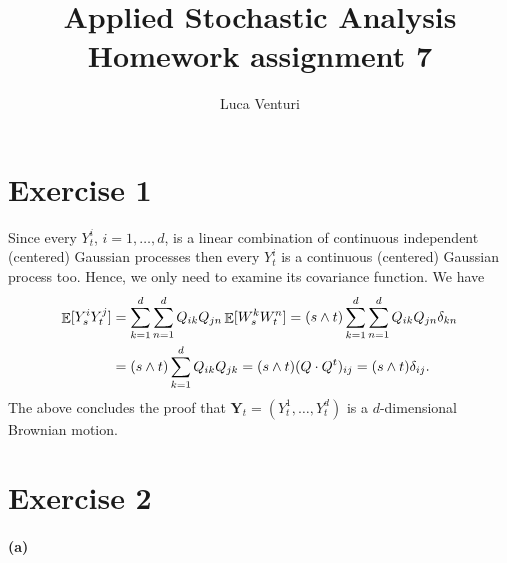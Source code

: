 \documentclass[a4paper,11pt]{article}
\theoremstyle{definition}
\theoremstyle{plain}
\theoremstyle{remark}
\DeclarePairedDelimiter{\parq}{[}{]}
\DeclareMathOperator*{\expval}{\mathbb{E}}
\begin{document}
\title{Applied Stochastic Analysis \\ Homework assignment 7}
\author{Luca Venturi}
\maketitle

\section*{Exercise 1}

Since every $Y_t^i$, $i=1,\dots,d$, is a linear combination of continuous independent (centered) Gaussian processes then every $Y_t^i$ is a continuous (centered) Gaussian process too. Hence, we only need to examine its covariance function. We have
\begin{align*}
\expval\parq{Y^i_sY^j_t} & = \sum_{k=1}^d\sum_{n=1}^d Q_{ik}Q_{jn}\expval\parq{W^k_sW^n_t} = (s\wedge t)\sum_{k=1}^d\sum_{n=1}^d Q_{ik}Q_{jn}\delta_{kn} \\ & = (s\wedge t)\sum_{k=1}^dQ_{ik}Q_{jk} = (s\wedge t)(Q\cdot Q^t)_{ij} = (s\wedge t)\delta_{ij}.
\end{align*}
The above concludes the proof that $\mathbf{Y}_t = (Y^1_t,\dots,Y^d_t)$ is a $d$-dimensional Brownian motion. 

\section*{Exercise 2}

\paragraph*{(a)}
\end{document}
